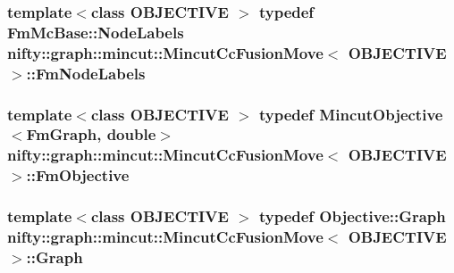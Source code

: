 \subsubsection[{Fm\+Node\+Labels}]{\setlength{\rightskip}{0pt plus 5cm}template$<$class O\+B\+J\+E\+C\+T\+I\+V\+E $>$ typedef {\bf Fm\+Mc\+Base\+::\+Node\+Labels} {\bf nifty\+::graph\+::mincut\+::\+Mincut\+Cc\+Fusion\+Move}$<$ O\+B\+J\+E\+C\+T\+I\+V\+E $>$\+::{\bf Fm\+Node\+Labels}}\label{classnifty_1_1graph_1_1mincut_1_1MincutCcFusionMove_a5b3284792834859af236031c18ee1c6d}
\hypertarget{classnifty_1_1graph_1_1mincut_1_1MincutCcFusionMove_a3014c9b5a32f7f4ba0d237a76855ea53}{}
\subsubsection[{Fm\+Objective}]{\setlength{\rightskip}{0pt plus 5cm}template$<$class O\+B\+J\+E\+C\+T\+I\+V\+E $>$ typedef {\bf Mincut\+Objective}$<${\bf Fm\+Graph}, double$>$ {\bf nifty\+::graph\+::mincut\+::\+Mincut\+Cc\+Fusion\+Move}$<$ O\+B\+J\+E\+C\+T\+I\+V\+E $>$\+::{\bf Fm\+Objective}}\label{classnifty_1_1graph_1_1mincut_1_1MincutCcFusionMove_a3014c9b5a32f7f4ba0d237a76855ea53}
\hypertarget{classnifty_1_1graph_1_1mincut_1_1MincutCcFusionMove_aa810246258c76c9b2e0a9f59310a0e6a}{}
\subsubsection[{Graph}]{\setlength{\rightskip}{0pt plus 5cm}template$<$class O\+B\+J\+E\+C\+T\+I\+V\+E $>$ typedef Objective\+::\+Graph {\bf nifty\+::graph\+::mincut\+::\+Mincut\+Cc\+Fusion\+Move}$<$ O\+B\+J\+E\+C\+T\+I\+V\+E $>$\+::{\bf Graph}}\label{classnifty_1_1graph_1_1mincut_1_1MincutCcFusionMove_aa810246258c76c9b2e0a9f59310a0e6a}
\hypertarget{classnifty_1_1graph_1_1mincut_1_1MincutCcFusionMove_a3f1635f715806dd64d352663dfbe8ee5}{}
